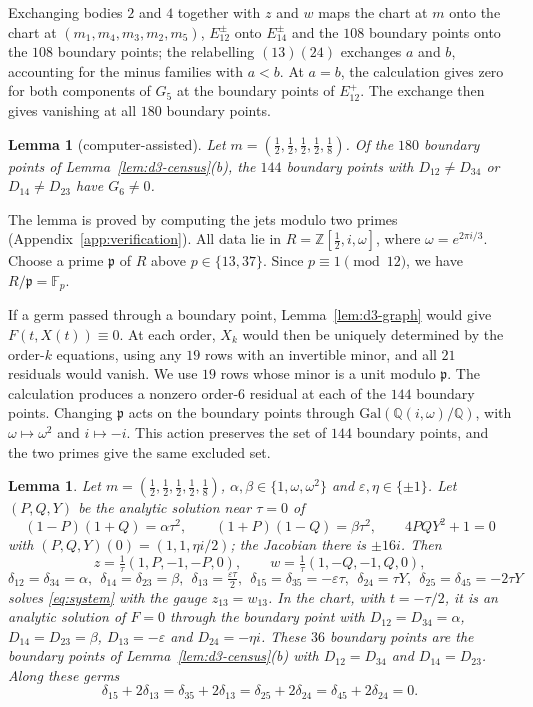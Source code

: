 \documentclass[Threeside,11pt]{article}
\newtheorem{lemma}[theorem]{Lemma}
\theoremstyle{definition}
\theoremstyle{remark}
\numberwithin{equation}{section}
\theoremstyle{remark}
\begin{document}
{Exchanging bodies $2$ and $4$ together with $z$ and
$w$ maps the chart at $m$ onto the chart at $(m_1,m_4,m_3,m_2,m_5)$, $E^\pm_{12}$ onto
$E^\pm_{14}$ and the $108$ boundary points onto the $108$ boundary points; the relabelling $(13)(24)$ exchanges $a$
and $b$, accounting for the minus families with $a<b$.
At $a=b$, the calculation gives zero for both components of $G_5$ at the boundary points of $E^+_{12}$.
The exchange then gives vanishing at all $180$ boundary points.}

\begin{lemma}[computer-assisted]\label{lem:d3-order6}
Let $m=(\frac12,\frac12,\frac12,\frac12,\frac18)$.  Of the $180$ boundary points of
Lemma~\ref{lem:d3-census}(b), the $144$ boundary points with $D_{12}\ne D_{34}$ or $D_{14}\ne D_{23}$ have
$G_6\neq0$.
\end{lemma}

{The lemma is proved by computing the jets modulo two primes
(Appendix~\ref{app:verification}). All data lie in $R=\mathbb Z[\frac12,i,\omega]$,
where $\omega=e^{2\pi i/3}$. Choose a prime $\mathfrak p$ of $R$ above $p\in\{13,37\}$.
Since $p\equiv1\pmod{12}$, we have $R/\mathfrak p=\mathbb F_p$.

If a germ passed through a boundary point, Lemma~\ref{lem:d3-graph} would give $F(t,X(t))\equiv0$.
At each order, $X_k$ would then be uniquely determined by the order-$k$ equations,
using any $19$ rows with an invertible minor, and all $21$ residuals would vanish.
We use $19$ rows whose minor is a unit modulo $\mathfrak p$.
The calculation produces a nonzero order-$6$ residual at each of the $144$ boundary points.
Changing $\mathfrak p$ acts on the boundary points through $\mathrm{Gal}(\mathbb Q(i,\omega)/\mathbb Q)$,
with $\omega\mapsto\omega^2$ and $i\mapsto-i$. This action preserves the set of $144$ boundary points,
and the two primes give the same excluded set.}

{\begin{lemma}\label{lem:d3-twisted}
Let $m=(\frac12,\frac12,\frac12,\frac12,\frac18)$, $\alpha,\beta\in\{1,\omega,\omega^2\}$ and
$\varepsilon,\eta\in\{\pm1\}$.  Let $(P,Q,Y)$ be the analytic solution near $\tau=0$ of
\[
(1-P)(1+Q)=\alpha\tau^2,\qquad (1+P)(1-Q)=\beta\tau^2,\qquad 4PQY^2+1=0
\]
with $(P,Q,Y)(0)=(1,1,\eta i/2)$; the Jacobian there is $\pm16i$.  Then
\[
z=\tfrac1\tau(1,P,-1,-P,0),\qquad w=\tfrac1\tau(1,-Q,-1,Q,0),
\]
\[
\delta_{12}=\delta_{34}=\alpha,\ \ \delta_{14}=\delta_{23}=\beta,\ \
\delta_{13}=\tfrac{\varepsilon\tau}2,\ \ \delta_{15}=\delta_{35}=-\varepsilon\tau,\ \
\delta_{24}=\tau Y,\ \ \delta_{25}=\delta_{45}=-2\tau Y
\]
solves \eqref{eq:system} with the gauge $z_{13}=w_{13}$.  In the chart, with $t=-\tau/2$, it is an
analytic solution of $F=0$ through the boundary point with $D_{12}=D_{34}=\alpha$, $D_{14}=D_{23}=\beta$,
$D_{13}=-\varepsilon$ and $D_{24}=-\eta i$.  These $36$ boundary points are the boundary points of
Lemma~\ref{lem:d3-census}(b) with $D_{12}=D_{34}$ and $D_{14}=D_{23}$.  Along these germs
\begin{equation}\label{eq:d3-identities}
\delta_{15}+2\delta_{13}=\delta_{35}+2\delta_{13}=\delta_{25}+2\delta_{24}=\delta_{45}+2\delta_{24}=0 .
\end{equation}
\end{lemma}}
\end{document}
